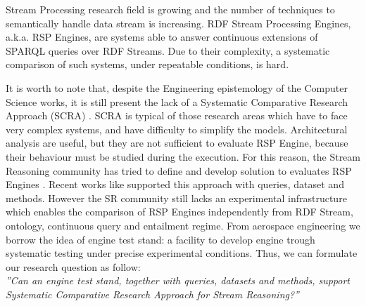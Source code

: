 Stream Processing research field is growing and the number of techniques to semantically handle data stream is increasing. RDF Stream Processing Engines, a.k.a. RSP Engines, are systems able to answer continuous extensions of SPARQL queries over RDF Streams. Due to their complexity, a systematic comparison of such systems, under repeatable conditions, is hard. 

It is worth to note that, despite the Engineering epistemology of the Computer Science works, it is still present the lack of a Systematic Comparative Research Approach (SCRA) \cite{Tichy:1995:EEC:209090.209093}. SCRA is typical of those research areas which have to face very complex systems, and have difficulty to simplify the models. Architectural analysis are useful, but they are not sufficient to evaluate RSP Engine, because their behaviour must be studied during the execution. For this reason, the Stream Reasoning community has tried to define and develop solution to evaluates RSP Engines \cite{DBLP:conf/esws/ScharrenbachUMVB13}. Recent works like \cite{Zhang2012, LePhuoc2012c, DBLP:conf/semweb/DellAglioCBCV13} supported this approach with queries, dataset and methods. However the SR community still lacks an experimental infrastructure which enables the comparison of RSP Engines independently from RDF Stream, ontology, continuous query and entailment regime.  From aerospace engineering we borrow the idea of engine test stand: a facility to develop engine trough systematic testing under precise experimental conditions. Thus, we can formulate our research question as follow:\\

\textit{”Can an engine test stand, together with queries, datasets and methods, support Systematic Comparative Research Approach for Stream Reasoning?”}\\


